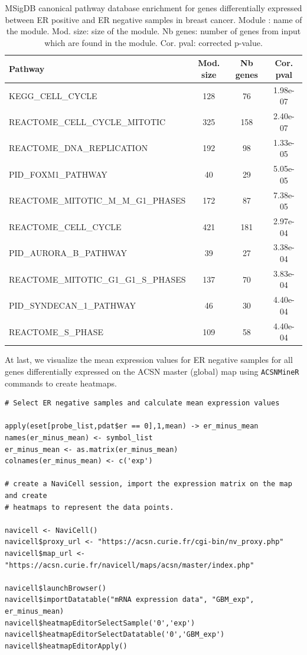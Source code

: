 \documentclass{article}
\begin{document}
\begin{table}[h!]
  \centering
  \caption{MSigDB canonical pathway database enrichment for genes differentially expressed between ER
positive and ER negative samples in breast cancer.  Module : name of the
module. Mod. size: size of the module. Nb genes: number of genes from input
which are found in the module. Cor. pval: corrected p-value.}
\label{tab:table_msigdb}

\begin{tabular}{l c c c}
\hline
Pathway & Mod. size & Nb genes & Cor. pval\\
\hline
KEGG\_CELL\_CYCLE & 128 & 76 & 1.98e-07\\
REACTOME\_CELL\_CYCLE\_MITOTIC & 325 & 158 & 2.40e-07\\
REACTOME\_DNA\_REPLICATION & 192 & 98 & 1.33e-05\\
PID\_FOXM1\_PATHWAY & 40 & 29 & 5.05e-05\\
REACTOME\_MITOTIC\_M\_M\_G1\_PHASES & 172 & 87 & 7.38e-05\\
REACTOME\_CELL\_CYCLE & 421 & 181 & 2.97e-04\\
PID\_AURORA\_B\_PATHWAY & 39 & 27 & 3.38e-04\\
REACTOME\_MITOTIC\_G1\_G1\_S\_PHASES & 137 & 70 & 3.83e-04\\ 
PID\_SYNDECAN\_1\_PATHWAY & 46 & 30 & 4.40e-04\\
REACTOME\_S\_PHASE & 109 & 58 & 4.40e-04\\
\hline
\end{tabular}
\end{table}

At last, we visualize the mean expression values for ER negative samples for all
genes differentially expressed on the ACSN master (global) map using \verb|ACSNMineR|
commands to create heatmaps.

\begin{verbatim}
# Select ER negative samples and calculate mean expression values

apply(eset[probe_list,pdat$er == 0],1,mean) -> er_minus_mean
names(er_minus_mean) <- symbol_list
er_minus_mean <- as.matrix(er_minus_mean)
colnames(er_minus_mean) <- c('exp')

# create a NaviCell session, import the expression matrix on the map and create
# heatmaps to represent the data points.

navicell <- NaviCell()
navicell$proxy_url <- "https://acsn.curie.fr/cgi-bin/nv_proxy.php"
navicell$map_url <- "https://acsn.curie.fr/navicell/maps/acsn/master/index.php"

navicell$launchBrowser()
navicell$importDatatable("mRNA expression data", "GBM_exp", er_minus_mean)
navicell$heatmapEditorSelectSample('0','exp')
navicell$heatmapEditorSelectDatatable('0','GBM_exp')
navicell$heatmapEditorApply()
\end{verbatim}
\end{document}
